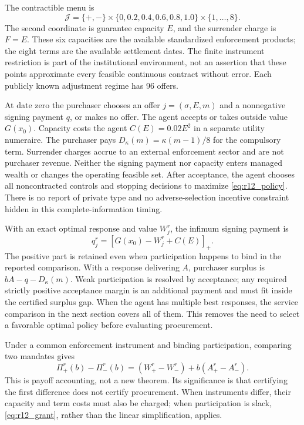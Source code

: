 The contractible menu is
\begin{equation}
 \mathcal J=\{+,-\}\times\{0,0.2,0.4,0.6,0.8,1.0\}\times\{1,\ldots,8\}.
 \label{eq:r12_menu}
\end{equation}
The second coordinate is guarantee capacity $E$, and the surrender charge is $F=E$. These six capacities are the available standardized enforcement products; the eight terms are the available settlement dates. The finite instrument restriction is part of the institutional environment, not an assertion that these points approximate every feasible continuous contract without error. Each publicly known adjustment regime has 96 offers.

At date zero the purchaser chooses an offer $j=(\sigma,E,m)$ and a nonnegative signing payment $q$, or makes no offer. The agent accepts or takes outside value $G(x_0)$. Capacity costs the agent $C(E)=0.02E^2$ in a separate utility numeraire. The purchaser pays $D_\kappa(m)=\kappa(m-1)/8$ for the compulsory term. Surrender charges accrue to an external enforcement sector and are not purchaser revenue. Neither the signing payment nor capacity enters managed wealth or changes the operating feasible set. After acceptance, the agent chooses all noncontracted controls and stopping decisions to maximize \eqref{eq:r12_policy}. There is no report of private type and no adverse-selection incentive constraint hidden in this complete-information timing.

With an exact optimal response and value $W^r_j$, the infimum signing payment is
\begin{equation}
 q^r_j=[G(x_0)-W^r_j+C(E)]_+.
 \label{eq:r12_grant}
\end{equation}
The positive part is retained even when participation happens to bind in the reported comparison. With a response delivering $A$, purchaser surplus is $bA-q-D_\kappa(m)$. Weak participation is resolved by acceptance; any required strictly positive acceptance margin is an additional payment and must fit inside the certified surplus gap. When the agent has multiple best responses, the service comparison in the next section covers all of them. This removes the need to select a favorable optimal policy before evaluating procurement.

Under a common enforcement instrument and binding participation, comparing two mandates gives
\begin{equation}
 \Pi^r_+(b)-\Pi^r_-(b)
   =(W^r_+-W^r_-)+b(A^r_+-A^r_-).
 \label{eq:r12_accounting}
\end{equation}
This is payoff accounting, not a new theorem. Its significance is that certifying the first difference does not certify procurement. When instruments differ, their capacity and term costs must also be charged; when participation is slack, \eqref{eq:r12_grant}, rather than the linear simplification, applies.

